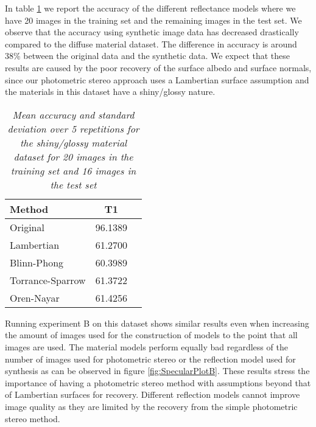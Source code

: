 In table \ref{tab:SpecularResultsA} we report the accuracy of the different reflectance models where we have 20 images in the training set and the remaining images in the test set. We observe that the accuracy using synthetic image data has decreased drastically compared to the diffuse material dataset. The difference in accuracy is around 38\% between the original data and the synthetic data. We expect that these results are caused by the poor recovery of the surface albedo and surface normals, since our photometric stereo approach uses a Lambertian surface assumption and the materials in this dataset have a shiny/glossy nature. 

\begin{table}
	\center
	\begin{tabular}{l|c|r}
	Method 				&	T1\\
	\hline
	Original			&	96.1389\\
	Lambertian 			&	61.2700\\
	Blinn-Phong 		& 	60.3989\\
	Torrance-Sparrow 	&	61.3722\\
	Oren-Nayar 			&	61.4256\\
	\end{tabular}
	\caption{{\it Mean accuracy and standard deviation over 5 repetitions for the shiny/glossy material dataset for 20 images in the training set and 16 images in the test set}}
	\label{tab:SpecularResultsA}
\end{table}

Running experiment B on this dataset shows similar results even when increasing the amount of images used for the construction of models to the point that all images are used. The material models perform equally bad regardless of the number of images used for photometric stereo or the reflection model used for synthesis as can be observed in figure \ref{fig:SpecularPlotB}. These results stress the importance of having a photometric stereo method with assumptions beyond that of Lambertian surfaces for recovery. Different reflection models cannot improve image quality as they are limited by the recovery from the simple photometric stereo method.

